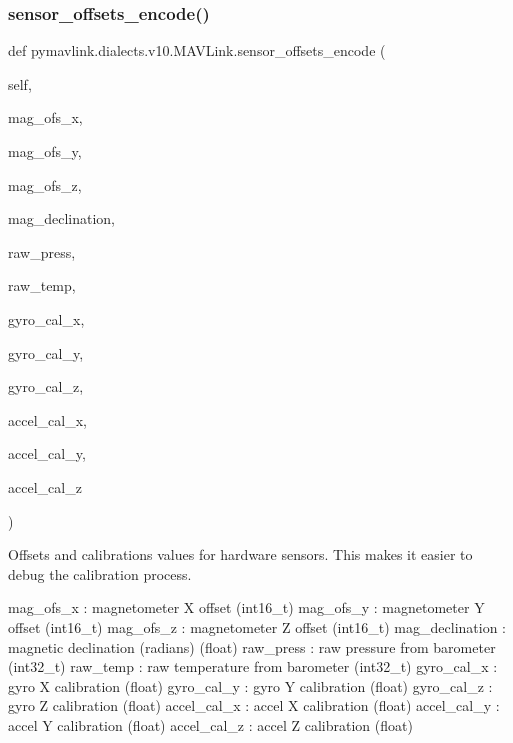 \begin{DoxyVerb}
\begin{DoxyVerb}
\begin{DoxyVerb}
\begin{DoxyVerb}
\begin{DoxyVerb}
\begin{DoxyVerb}
\begin{DoxyVerb}
\begin{DoxyVerb}
\begin{DoxyVerb}
\begin{DoxyVerb}
\subsubsection{\texorpdfstring{sensor\+\_\+offsets\+\_\+encode()}{sensor\_offsets\_encode()}}
{\footnotesize\ttfamily def pymavlink.\+dialects.\+v10.\+M\+A\+V\+Link.\+sensor\+\_\+offsets\+\_\+encode (\begin{DoxyParamCaption}\item[{}]{self,  }\item[{}]{mag\+\_\+ofs\+\_\+x,  }\item[{}]{mag\+\_\+ofs\+\_\+y,  }\item[{}]{mag\+\_\+ofs\+\_\+z,  }\item[{}]{mag\+\_\+declination,  }\item[{}]{raw\+\_\+press,  }\item[{}]{raw\+\_\+temp,  }\item[{}]{gyro\+\_\+cal\+\_\+x,  }\item[{}]{gyro\+\_\+cal\+\_\+y,  }\item[{}]{gyro\+\_\+cal\+\_\+z,  }\item[{}]{accel\+\_\+cal\+\_\+x,  }\item[{}]{accel\+\_\+cal\+\_\+y,  }\item[{}]{accel\+\_\+cal\+\_\+z }\end{DoxyParamCaption})}

\begin{DoxyVerb}Offsets and calibrations values for hardware sensors. This makes it
easier to debug the calibration process.

mag_ofs_x                 : magnetometer X offset (int16_t)
mag_ofs_y                 : magnetometer Y offset (int16_t)
mag_ofs_z                 : magnetometer Z offset (int16_t)
mag_declination           : magnetic declination (radians) (float)
raw_press                 : raw pressure from barometer (int32_t)
raw_temp                  : raw temperature from barometer (int32_t)
gyro_cal_x                : gyro X calibration (float)
gyro_cal_y                : gyro Y calibration (float)
gyro_cal_z                : gyro Z calibration (float)
accel_cal_x               : accel X calibration (float)
accel_cal_y               : accel Y calibration (float)
accel_cal_z               : accel Z calibration (float)\end{DoxyVerb}
 \mbox{\label{classpymavlink_1_1dialects_1_1v10_1_1MAVLink_ae1ec375518e212663f29cb18fac40fb0}} 

\end{DoxyVerb}
\end{DoxyVerb}
\end{DoxyVerb}
\end{DoxyVerb}
\end{DoxyVerb}
\end{DoxyVerb}
\end{DoxyVerb}
\end{DoxyVerb}
\end{DoxyVerb}
\end{DoxyVerb}
